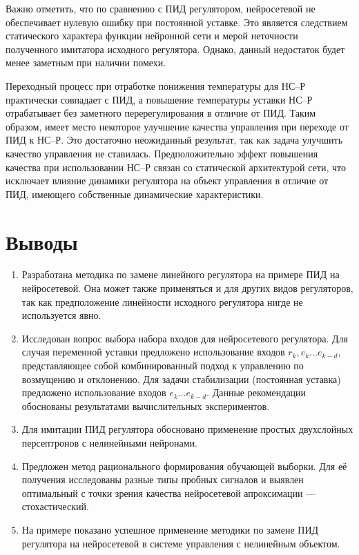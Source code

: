 Важно отметить, что по сравнению с ПИД регулятором, нейросетевой не
обеспечивает нулевую ошибку при постоянной уставке.  Это является
следствием статического характера функции нейронной сети и мерой
неточности полученного имитатора исходного регулятора.  Однако, данный
недостаток будет менее заметным при наличии помехи.

Переходный процесс при отработке понижения температуры для НС--Р
практически совпадает с ПИД, а повышение температуры уставки НС--Р
отрабатывает без заметного перерегулирования в отличие от ПИД.  Таким
образом, имеет место некоторое улучшение качества управления при
переходе от ПИД к НС--Р.  Это достаточно неожиданный результат, так
как задача улучшить качество управления не ставилась.
Предположительно эффект повышения качества при использовании НС--Р
связан со статической архитектурой сети, что исключает влияние
динамики регулятора на объект управления в отличие от ПИД, имеющего
собственные динамические характеристики.


\section{Выводы}

\begin{enumerate}

\item Разработана методика по замене линейного регулятора на примере
  ПИД на нейросетевой.  Она может также применяться и для других видов
  регуляторов, так как предположение линейности исходного регулятора
  нигде не используется явно.

\item Исследован вопрос выбора набора входов для нейросетевого
  регулятора.  Для случая переменной уставки предложено использование
  входов $r_k,e_k\ldots e_{k-d}$, представляющее собой комбинированный
  подход к управлению по возмущению и отклонению.  Для задачи
  стабилизации (постоянная уставка) предложено использование входов
  $e_k\ldots e_{k-d}$.  Данные рекомендации обоснованы результатами
  вычислительных экспериментов.

\item Для имитации ПИД регулятора обосновано применение простых
  двухслойных персептронов с нелинейными нейронами.

\item Предложен метод рационального формирования обучающей выборки.
  Для её получения исследованы разные типы пробных сигналов и выявлен
  оптимальный с точки зрения качества нейросетевой апроксимации ---
  стохастический.

\item На примере показано успешное применение методики по замене ПИД
  регулятора на нейросетевой в системе управления с нелинейным
  объектом.


\end{enumerate}
